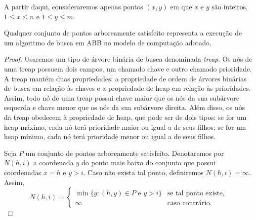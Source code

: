 A partir daqui, consideraremos apenas pontos $(x,y)$ em que $x$ e $y$ são inteiros, $1 \leq x \leq n$ e $1 \leq y \leq m$.

\begin{lemma}Qualquer conjunto de pontos arboreamente satisfeito representa a execução de um algoritmo de busca em ABB no modelo de computação adotado.
\end{lemma}

\begin{proof}
Usaremos um tipo de árvore binária de busca denominada \textit{treap}. Os nós de uma treap possuem dois campos, um chamado chave e outro chamado prioridade. A treap mantém duas propriedades: a propriedade de ordem de árvores binárias de busca em relação às chaves e a propriedade de heap em relação às prioridades. Assim, todo nó de uma treap possui chave maior que os nós da sua subárvore esquerda e chave menor que os nós da sua subárvore direita. Além disso, os nós da treap obedecem à propriedade de heap, que pode ser de dois tipos: se for um heap máximo, cada nó terá prioridade maior ou igual a de seus filhos; se for um heap mínimo, cada nó terá prioridade menor ou igual a de seus filhos.

Seja $P$ um conjunto de pontos arboreamente satisfeito. Denotaremos por $N(h,i)$ a coordenada $y$ do ponto mais baixo do conjunto que possui coordenadas $x = h$ e $y > i$. Caso não exista tal ponto, definiremos $N(h,i) = \infty$. Assim, 
\[
N(h,i) = 
\begin{cases}
    \min\{y : (h,y) \in P \text{ e } y > i\} & \text{se tal ponto existe,} \\
    \infty & \text{caso contrário.}
\end{cases}
\]





\end{proof}
